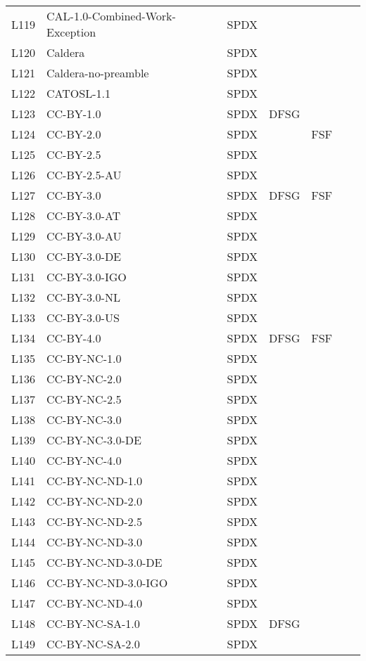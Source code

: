 \begin{longtable}[h]{m{2cm} | m{7cm} | c | c | c | c | c}
  L119 & CAL-1.0-Combined-Work-Exception & SPDX &  &  &  &  \\
  L120 & Caldera & SPDX &  &  &  &  \\
  L121 & Caldera-no-preamble & SPDX &  &  &  &  \\
  L122 & CATOSL-1.1 & SPDX &  &  &  &  \\
  L123 & CC-BY-1.0 & SPDX & DFSG &  &  &  \\
  L124 & CC-BY-2.0 & SPDX &  & FSF &  &  \\
  L125 & CC-BY-2.5 & SPDX &  &  &  &  \\
  L126 & CC-BY-2.5-AU & SPDX &  &  &  &  \\
  L127 & CC-BY-3.0 & SPDX & DFSG & FSF &  &  \\
  L128 & CC-BY-3.0-AT & SPDX &  &  &  &  \\
  L129 & CC-BY-3.0-AU & SPDX &  &  &  &  \\
  L130 & CC-BY-3.0-DE & SPDX &  &  &  &  \\
  L131 & CC-BY-3.0-IGO & SPDX &  &  &  &  \\
  L132 & CC-BY-3.0-NL & SPDX &  &  &  &  \\
  L133 & CC-BY-3.0-US & SPDX &  &  &  &  \\
  L134 & CC-BY-4.0 & SPDX & DFSG & FSF &  &  \\
  L135 & CC-BY-NC-1.0 & SPDX &  &  &  &  \\
  L136 & CC-BY-NC-2.0 & SPDX &  &  &  &  \\
  L137 & CC-BY-NC-2.5 & SPDX &  &  &  &  \\
  L138 & CC-BY-NC-3.0 & SPDX &  &  &  &  \\
  L139 & CC-BY-NC-3.0-DE & SPDX &  &  &  &  \\
  L140 & CC-BY-NC-4.0 & SPDX &  &  &  &  \\
  L141 & CC-BY-NC-ND-1.0 & SPDX &  &  &  &  \\
  L142 & CC-BY-NC-ND-2.0 & SPDX &  &  &  &  \\
  L143 & CC-BY-NC-ND-2.5 & SPDX &  &  &  &  \\
  L144 & CC-BY-NC-ND-3.0 & SPDX &  &  &  &  \\
  L145 & CC-BY-NC-ND-3.0-DE & SPDX &  &  &  &  \\
  L146 & CC-BY-NC-ND-3.0-IGO & SPDX &  &  &  &  \\
  L147 & CC-BY-NC-ND-4.0 & SPDX &  &  &  &  \\
  L148 & CC-BY-NC-SA-1.0 & SPDX & DFSG &  &  &  \\
  L149 & CC-BY-NC-SA-2.0 & SPDX &  &  &  &  \\

\end{longtable}
